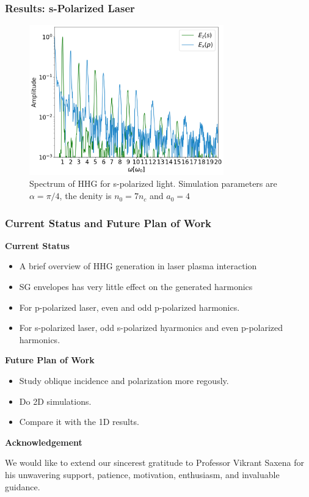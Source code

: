\documentclass{beamer}
\begin{document}
\begin{frame}
    \frametitle{Results: s-Polarized Laser}
    \begin{figure}
        \centering
        \includegraphics[width=0.75\textwidth]{images/s_fft.png}
        \caption{\small{Spectrum of HHG for s-polarized light. Simulation parameters are $\alpha = \pi/4$, the denity is $n_0 = 7n_c$ and $a_0 = 4$}}
    \end{figure}
\end{frame}

\begin{frame}
    \frametitle{Current Status and Future Plan of Work}
    \small
    \textbf{Current Status}
    \begin{itemize}
        \item A brief overview of HHG generation in laser plasma interaction
        \item SG envelopes has very little effect on the generated harmonics
        \item For p-polarized laser, even and odd p-polarized harmonics.
        \item For s-polarized laser, odd s-polarized hyarmonics and even p-polarized harmonics.
    \end{itemize}
    \textbf{Future Plan of Work}
    \begin{itemize}
        \item Study oblique incidence and polarization more regously.
        \item Do 2D simulations.
        \item Compare it with the 1D results.
    \end{itemize}
    \textbf{Acknowledgement}

    We would like to extend our sincerest gratitude to Professor Vikrant Saxena for his unwavering support, patience, motivation, enthusiasm, and invaluable guidance.
\end{frame}
\end{document}
